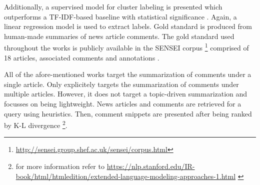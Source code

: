Additionally, a supervised model for cluster labeling \cite{DBLP:conf/inlg/AkerPKFBHG16} is presented which outperforms a TF-IDF-based baseline with statistical significance \cite{DBLP:conf/inlg/AkerPKFBHG16}. Again, a linear regression model is used to extract labels. Gold standard is produced from human-made summaries of news article comments.
The gold standard used throughout the works is publicly available in the SENSEI corpus \footnote{\url{http://sensei.group.shef.ac.uk/sensei/corpus.html}} comprised of 18 articles, associated comments and annotations  \cite{DBLP:conf/sigdial/BarkerPAKHG16} . \par
All of the afore-mentioned works target the summarization of comments under a single article.
Only \cite{Raveendran:2012:LCS:2348283.2348490} explicitely targets the summarization of comments under multiple articles. However, it does not target a topic-driven summarization and focusses on being lightweight. News articles and comments are retrieved for a query using heuristics. Then, comment snippets are presented after being ranked by K-L divergence \footnote{for more information refer to \url{https://nlp.stanford.edu/IR-book/html/htmledition/extended-language-modeling-approaches-1.html} \cite{Manning:2008:IIR:1394399}}.
